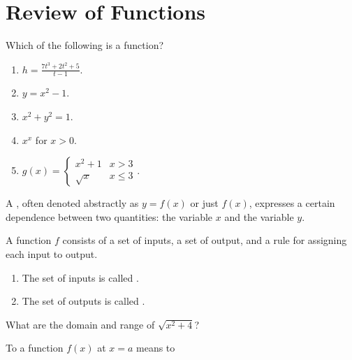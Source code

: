 \documentclass[../main.tex]{subfiles}
\begin{document}
 \section{Review of Functions}
  \begin{example}
    Which of the following is  a function?
    \begin{enumerate}[label=(\alph*)]
      \item \(h = \frac{7t^{3} + 2t^{2} + 5}{t - 1}\).
      \item \(y = x^{2} - 1\).
      \item \(x^{2} + y^{2} = 1\).
      \item \(x^{x}\) for \(x > 0\).
      \item \(g(x) = \begin{cases} x^{2} + 1 & x > 3\\ \sqrt{x} & x \le 3 \end{cases}\).
    \end{enumerate}
  \end{example} 


  A , often denoted abstractly as \(y = f(x)\) or just \(f(x)\), expresses a certain dependence between two quantities: the  variable \(x\) and the  variable \(y\).
  \vspace{1em}

  \begin{mdframed}[style=withref]
    A function \(f\) consists of a set of inputs, a set of output, and a rule for assigning each input to \underline{\hspace{2in}} output.
    \begin{enumerate}
      \item The set of inputs is called \underline{\hspace{1in}}.
      \item The set of outputs is called \underline{\hspace{1in}}.
    \end{enumerate}

  \end{mdframed}

  \begin{example}
    What are the domain and range of \(\sqrt{x^{2} + 4}\)?
  \end{example}

  To  a function \(f(x)\) at \(x = a\) means to \underline{\hspace{3in}}
\end{document}
